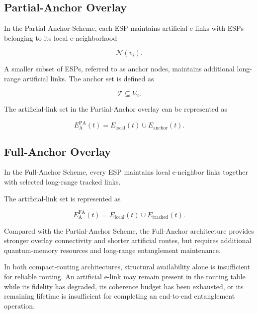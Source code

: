 \subsection{Partial-Anchor Overlay}

In the Partial-Anchor Scheme, each ESP maintains artificial e-links with ESPs belonging to its local e-neighborhood

\begin{equation}
    \mathcal{N}(v_i).
\end{equation}

A smaller subset of ESPs, referred to as anchor nodes, maintains additional long-range artificial links. The anchor set is defined as

\begin{equation}
    \mathcal{T}
    \subseteq
    V_2 .
\end{equation}

The artificial-link set in the Partial-Anchor overlay can be represented as

\begin{equation}
    E_{\mathrm{A}}^{\mathrm{PA}}(t)
    =
    E_{\mathrm{local}}(t)
    \cup
    E_{\mathrm{anchor}}(t).
\end{equation}

\subsection{Full-Anchor Overlay}

In the Full-Anchor Scheme, every ESP maintains local e-neighbor links together with selected long-range tracked links.

The artificial-link set is represented as

\begin{equation}
    E_{\mathrm{A}}^{\mathrm{FA}}(t)
    =
    E_{\mathrm{local}}(t)
    \cup
    E_{\mathrm{tracked}}(t).
\end{equation}

Compared with the Partial-Anchor Scheme, the Full-Anchor architecture provides stronger overlay connectivity and shorter artificial routes, but requires additional quantum-memory resources and long-range entanglement maintenance.

In both compact-routing architectures, structural availability alone is insufficient for reliable routing. An artificial e-link may remain present in the routing table while its fidelity has degraded, its coherence budget has been exhausted, or its remaining lifetime is insufficient for completing an end-to-end entanglement operation.

